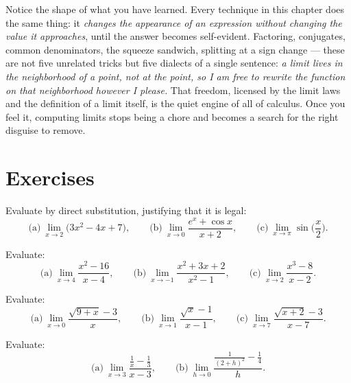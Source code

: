 \begin{aestheticbox}
Notice the shape of what you have learned. Every technique in
this chapter does the same thing: it \emph{changes the appearance of an
expression without changing the value it approaches}, until the answer becomes
self-evident. Factoring, conjugates, common denominators, the squeeze
sandwich, splitting at a sign change --- these are not five unrelated tricks
but five dialects of a single sentence: \emph{a limit lives in the
neighborhood of a point, not at the point, so I am free to rewrite the function
on that neighborhood however I please.} That freedom, licensed by the limit
laws and the definition of a limit itself, is the quiet engine of all of
calculus. Once you feel it, computing limits stops being a chore and becomes
a search for the right disguise to remove.
\end{aestheticbox}

\section*{Exercises}

\begin{exercise}[Substitution]
\label{ch07:exr-subst}
Evaluate by direct substitution, justifying that it is legal:
\[
  \text{(a)}\ \lim_{x\to 2}\big(3x^{2}-4x+7\big),
  \qquad
  \text{(b)}\ \lim_{x\to 0}\frac{e^{x}+\cos x}{x+2},
  \qquad
  \text{(c)}\ \lim_{x\to \pi}\sin\!\Big(\frac{x}{2}\Big).
\]
\end{exercise}

\begin{exercise}
\label{ch07:exr-factor}
Evaluate:
\[
  \text{(a)}\ \lim_{x\to 4}\frac{x^{2}-16}{x-4},
  \qquad
  \text{(b)}\ \lim_{x\to -1}\frac{x^{2}+3x+2}{x^{2}-1},
  \qquad
  \text{(c)}\ \lim_{x\to 2}\frac{x^{3}-8}{x-2}.
\]
\end{exercise}

\begin{exercise}[Rationalize]
\label{ch07:exr-rat}
Evaluate:
\[
  \text{(a)}\ \lim_{x\to 0}\frac{\sqrt{9+x}-3}{x},
  \qquad
  \text{(b)}\ \lim_{x\to 1}\frac{\sqrt{x}-1}{x-1},
  \qquad
  \text{(c)}\ \lim_{x\to 7}\frac{\sqrt{x+2}-3}{x-7}.
\]
\end{exercise}

\begin{exercise}
\label{ch07:exr-complex}
Evaluate:
\[
  \text{(a)}\ \lim_{x\to 3}\frac{\frac{1}{x}-\frac13}{x-3},
  \qquad
  \text{(b)}\ \lim_{h\to 0}\frac{\frac{1}{(2+h)^{2}}-\frac14}{h}.
\]
\end{exercise}

